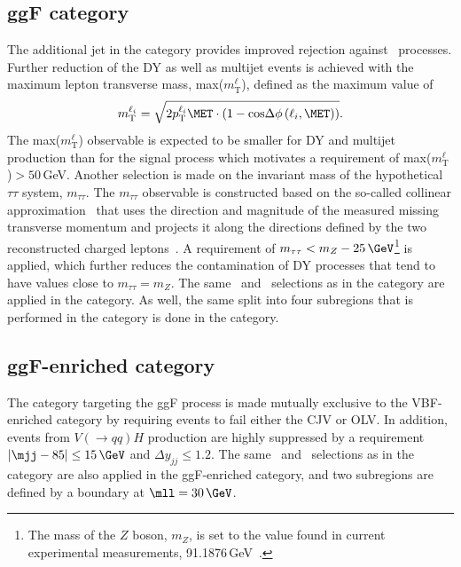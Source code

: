 \subsection{ggF \OneJet category}
\label{subsec:ggf-one-jet-category}
The additional jet in the \OneJet category provides improved rejection against \Ztautau\ processes.
Further reduction of the DY as well as multijet events is achieved with the maximum lepton transverse mass, max($m_{\text{T}}^\ell$), defined as the maximum value of 
\begin{equation}
    m_{\text{T}}^{\ell_i} = \sqrt{ 2 p_\text{T}^{\ell_i} \MET \cdot \left( 1 - \text{cos} \Delta \phi \left( \ell_i, \MET \right) \right) }.
\end{equation}
The max($m_{\text{T}}^\ell$) observable is expected to be smaller for DY and multijet production than for the signal process which motivates a requirement of max($m_{\text{T}}^\ell$)$ > 50\,$GeV.
Another selection is made on the invariant mass of the hypothetical $\tau\tau$ system, $m_{\tau\tau}$.
The $m_{\tau\tau}$ observable is constructed based on the so-called collinear approximation~\cite{PhysRevD.61.093005} that uses the direction and magnitude of the measured missing transverse momentum and projects it along the directions defined by the two reconstructed charged leptons~\cite{PLACEHOLDER:PAPER:CITATION}.
A requirement of $m_{\tau\tau} < m_Z - 25\,\GeV$\footnote{The mass of the $Z$ boson, $m_Z$, is set to the value found in current experimental measurements, 91.1876\,GeV~\cite{PDG2020}.} is applied, which further reduces the contamination of DY processes that tend to have values close to $m_{\tau\tau} = m_Z$.
The same \mll\ and \DPhill\ selections as in the \ZeroJet category are applied in the \OneJet category. As well, the same split into four subregions that is performed in the \ZeroJet category is done in the \OneJet category.

\subsection{ggF-enriched \TwoJet category}
\label{subsec:ggf-two-jet-category}
The \TwoJet category targeting the ggF process is made mutually exclusive to the VBF-enriched \TwoJet category by requiring events to fail either the CJV or OLV. 
In addition, events from $V(\to qq) H$ production are highly suppressed by a requirement $|\mjj  - 85| \le 15\,\GeV$ and $\Delta y_{jj} \le 1.2$. 
The same \mll\ and \DPhill\ selections as in the \ZeroJet category are also applied in the ggF-enriched \TwoJet category, and two subregions are defined by a boundary at $\mll = 30\,\GeV$.

